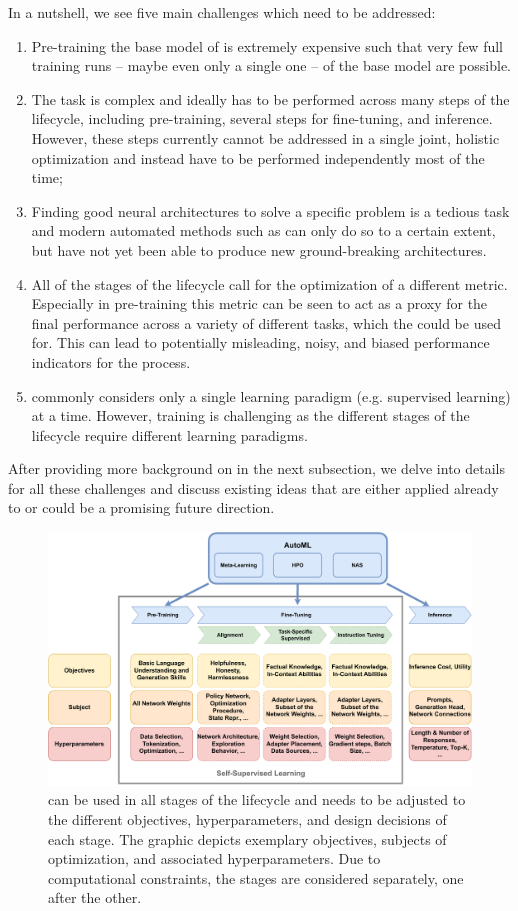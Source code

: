 In a nutshell, we see five main challenges which need to be addressed: 
\begin{enumerate} 
    \item Pre-training the base model of \LLMs is extremely expensive such that very few full training runs -- maybe even only a single one -- of the \LLM base model are possible.
    \item The \AutoML task is complex and ideally has to be performed across many steps of the \LLM lifecycle, including pre-training, several steps for fine-tuning, and inference. However, these steps currently cannot be addressed in a single joint, holistic optimization and instead have to be performed independently most of the time;
    \item Finding good neural architectures to solve a specific problem is a tedious task and modern automated methods such as \NAS can only do so to a certain extent, but have not yet been able to produce new ground-breaking architectures.
    \item All of the stages of the \LLM lifecycle call for the optimization of a different metric. Especially in pre-training this metric can be seen to act as a proxy for the final performance across a variety of different tasks, which the \LLM could be used for. This can lead to potentially misleading, noisy, and biased performance indicators for the \AutoML process.
    \item \AutoML commonly considers only a single learning paradigm (e.g. supervised learning) at a time. However, training \LLMs is challenging as the different stages of the lifecycle require different learning paradigms.
\end{enumerate}

After providing more background on \LLMs in the next subsection, we delve into details for all these challenges and discuss existing \AutoML ideas that are either applied already to \LLMs or could be a promising future direction.

\begin{figure}
    \centering
    \includegraphics[width=.75\textwidth]{chapters/human-centric/llm/img/automl_for_llms.pdf}
    \caption{\AutoML can be used in all stages of the \LLM lifecycle and needs to be adjusted to the different objectives, hyperparameters, and design decisions of each stage. The graphic depicts exemplary objectives, subjects of optimization, and associated hyperparameters. Due to computational constraints, the stages are considered separately, one after the other.}
    \label{llm-fig:automl_for_llms}
\end{figure}

